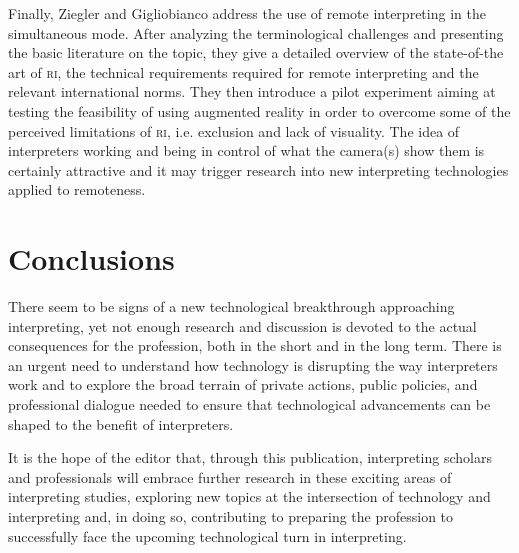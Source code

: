 \documentclass[output=paper]{langsci/langscibook}
\begin{document}
Finally, Ziegler and Gigliobianco address the use of remote interpreting in the simultaneous mode. After analyzing the terminological challenges and presenting the basic literature on the topic, they give a detailed overview of the state-of-the art of \textsc{ri}, the technical requirements required for remote interpreting and the relevant international norms. They then introduce a pilot experiment aiming at testing the feasibility of using augmented reality in order to overcome some of the perceived limitations of \textsc{ri}, i.e. exclusion and lack of visuality. The idea of interpreters working and being in control of what the camera(s) show them is certainly attractive and it may trigger research into new interpreting technologies applied to remoteness. 
 
\section{Conclusions} 
 
There seem to be signs of a new technological breakthrough approaching interpreting, yet not enough research and discussion is devoted to the actual consequences for the profession, both in the short and in the long term. There is an urgent need to understand how technology is disrupting the way interpreters work and to explore the broad terrain of private actions, public policies, and professional dialogue needed to ensure that technological advancements can be shaped to the benefit of interpreters. 

It is the hope of the editor that, through this publication, interpreting scholars and professionals will embrace further research in these exciting areas of interpreting studies, exploring new topics at the intersection of technology and interpreting and, in doing so, contributing to preparing the profession to successfully face the upcoming technological turn in interpreting.  

\sloppy
\printbibliography[heading=subbibliography,notkeyword=this]
\end{document}

